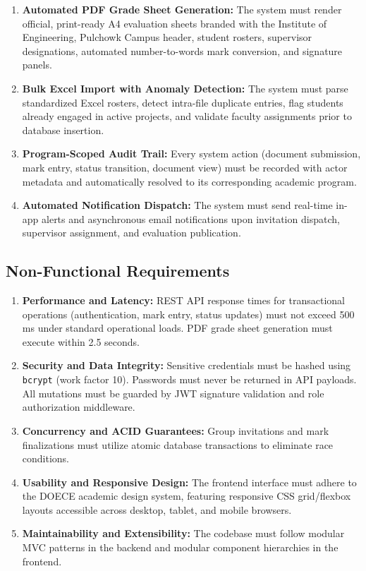 \begin{enumerate}[label=\textbf{FR\arabic*.}]
    \item \textbf{Automated PDF Grade Sheet Generation:} The system must render official, print-ready A4 evaluation sheets branded with the Institute of Engineering, Pulchowk Campus header, student rosters, supervisor designations, automated number-to-words mark conversion, and signature panels.
    
    \item \textbf{Bulk Excel Import with Anomaly Detection:} The system must parse standardized Excel rosters, detect intra-file duplicate entries, flag students already engaged in active projects, and validate faculty assignments prior to database insertion.
    
    \item \textbf{Program-Scoped Audit Trail:} Every system action (document submission, mark entry, status transition, document view) must be recorded with actor metadata and automatically resolved to its corresponding academic program.
    
    \item \textbf{Automated Notification Dispatch:} The system must send real-time in-app alerts and asynchronous email notifications upon invitation dispatch, supervisor assignment, and evaluation publication.
\end{enumerate}

\subsection{Non-Functional Requirements}

\begin{enumerate}[label=\textbf{NFR\arabic*.}]
    \item \textbf{Performance and Latency:} REST API response times for transactional operations (authentication, mark entry, status updates) must not exceed 500 ms under standard operational loads. PDF grade sheet generation must execute within 2.5 seconds.
    \item \textbf{Security and Data Integrity:} Sensitive credentials must be hashed using \texttt{bcrypt} (work factor 10). Passwords must never be returned in API payloads. All mutations must be guarded by JWT signature validation and role authorization middleware.
    \item \textbf{Concurrency and ACID Guarantees:} Group invitations and mark finalizations must utilize atomic database transactions to eliminate race conditions.
    \item \textbf{Usability and Responsive Design:} The frontend interface must adhere to the DOECE academic design system, featuring responsive CSS grid/flexbox layouts accessible across desktop, tablet, and mobile browsers.
    \item \textbf{Maintainability and Extensibility:} The codebase must follow modular MVC patterns in the backend and modular component hierarchies in the frontend.
\end{enumerate}

